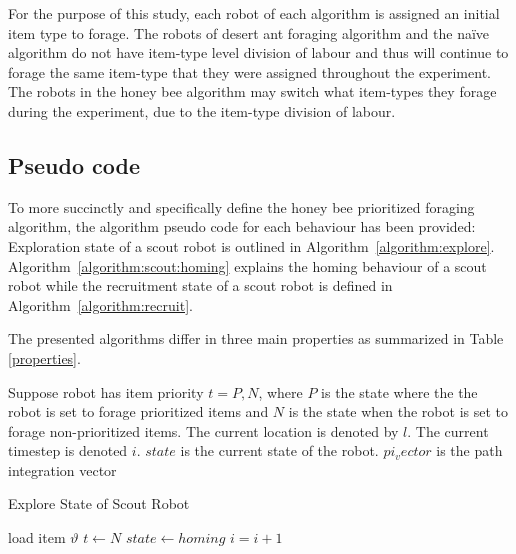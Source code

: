 For the purpose of this study, each robot of each algorithm is assigned an initial item type to forage. The robots of desert ant foraging algorithm and the na\"ive algorithm do not have item-type level division of labour and thus will continue to forage the same item-type that they were assigned throughout the experiment. The robots in the honey bee algorithm may switch what item-types they forage during the experiment, due to the item-type division of labour. 

\subsection{Pseudo code}
To more succinctly and specifically define the honey bee prioritized foraging algorithm, the algorithm pseudo code for each behaviour has been provided: Exploration state of a scout robot is outlined in Algorithm~\ref{algorithm:explore}. Algorithm~\ref{algorithm:scout:homing} explains the homing behaviour of a scout robot while the recruitment state of a scout robot is defined in Algorithm~\ref{algorithm:recruit}. 

The presented algorithms differ in three main properties as summarized in Table \ref{properties}.

Suppose robot has item priority $t={P,N}$, where $P$ is the state where the the robot is set to forage prioritized items and $N$ is the state when the robot is set to forage non-prioritized items. The current location is denoted by $l$. The current timestep is denoted $i$. $state$ is the current state of the robot. $pi_vector$ is the path integration vector

\begin{algorithm}
\caption{Explore State of Scout Robot}
\label{algorithm:explore}
\begin{algorithmic}[1]
\State {}
\State {}
 	\State {}
	\State load item $\vartheta$
	\State $t \gets N$
	\State $state \gets homing$
\EndIf
\State $i =i + 1$
\EndFunction
\end{algorithmic}
\end{algorithm}

